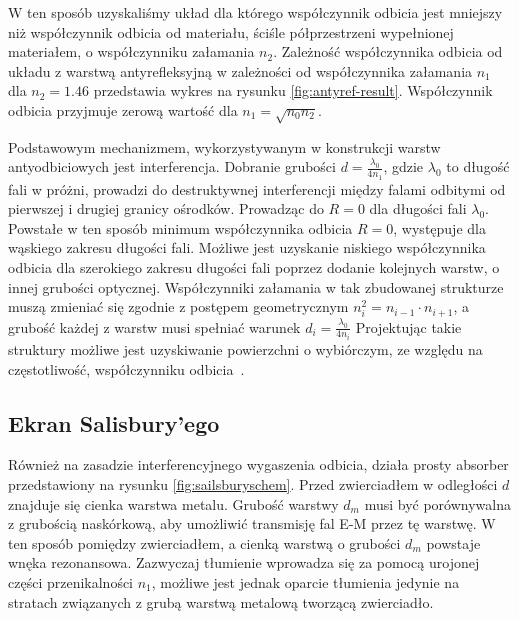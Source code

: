  W ten sposób uzyskaliśmy układ dla którego współczynnik odbicia jest mniejszy niż współczynnik odbicia od materiału, ściśle półprzestrzeni wypełnionej materiałem, o współczynniku załamania $n_2$. Zależność współczynnika odbicia od układu z warstwą antyrefleksyjną w zależności od współczynnika załamania $n_1$ dla $n_2=1.46$ przedstawia wykres na rysunku \ref{fig:antyref-result}. Współczynnik odbicia przyjmuje zerową wartość dla $n_1=\sqrt{n_0 n_2}$.

Podstawowym mechanizmem, wykorzystywanym w konstrukcji warstw antyodbiciowych jest interferencja. Dobranie grubości $d=\frac{\lambda_0}{4 n_1}$, gdzie $\lambda_0$ to długość fali w próżni, prowadzi do destruktywnej interferencji między falami odbitymi od pierwszej i drugiej granicy ośrodków. Prowadząc do $R=0$ dla długości fali $\lambda_0$. Powstałe w ten sposób minimum współczynnika odbicia $R=0$, występuje dla wąskiego zakresu długości fali. Możliwe jest uzyskanie niskiego współczynnika odbicia dla szerokiego zakresu długości fali poprzez dodanie kolejnych warstw, o innej grubości optycznej. Współczynniki załamania w tak zbudowanej strukturze muszą zmieniać się zgodnie z postępem geometrycznym $n_i^2=n_{i-1} \cdot n_{i+1}$, a grubość każdej z warstw musi spełniać warunek $d_i=\frac{\lambda_0}{4 n_i}$  Projektując takie struktury możliwe jest uzyskiwanie powierzchni o wybiórczym, ze względu na częstotliwość, współczynniku odbicia~\cite{monacelli2005infrared}. 

\subsection{Ekran Salisbury'ego}
Również na zasadzie interferencyjnego wygaszenia odbicia, działa prosty absorber przedstawiony na rysunku \ref{fig:sailsburyschem}. Przed zwierciadłem w odległości $d$ znajduje się cienka warstwa metalu. Grubość warstwy $d_m$ musi być porównywalna z grubością naskórkową, aby umożliwić transmisję fal E-M przez tę warstwę. W ten sposób pomiędzy zwierciadłem, a cienką warstwą o grubości $d_m$ powstaje wnęka rezonansowa. Zazwyczaj tłumienie wprowadza się za pomocą urojonej części przenikalności $n_1$, możliwe jest jednak oparcie tłumienia jedynie na stratach związanych z grubą warstwą metalową tworzącą zwierciadło. 

